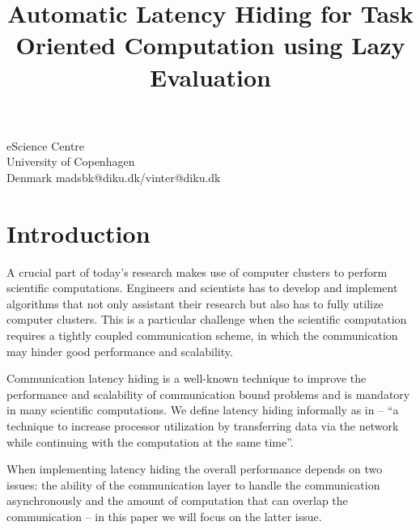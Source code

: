 \documentclass[preprint]{../PGAS10/sigplanconf}
\begin{document}


\title{Automatic Latency Hiding for Task Oriented Computation using Lazy Evaluation}

           {eScience Centre\\ University of Copenhagen\\ Denmark}
           {madsbk@diku.dk/vinter@diku.dk}

\maketitle

\begin{abstract}

\end{abstract}

\section{Introduction}
A crucial part of today’s research makes use of computer clusters to perform scientific computations. Engineers and scientists has to develop and implement algorithms that not only assistant their research but also has to fully utilize computer clusters. This is a particular challenge when the scientific computation requires a tightly coupled communication scheme, in which the communication may hinder good performance and scalability.

Communication latency hiding is a well-known technique to improve the performance and scalability of communication bound problems and is mandatory in many scientific computations. We define latency hiding informally as in \cite{Strumpen94latencyhiding} -- ``a technique to increase processor utilization by transferring data via the network while continuing with the computation at the same time''.

When implementing latency hiding the overall performance depends on two issues: the ability of the communication layer to handle the communication asynchronously and the amount of computation that can overlap the communication -- in this paper we will focus on the latter issue.
\end{document}
